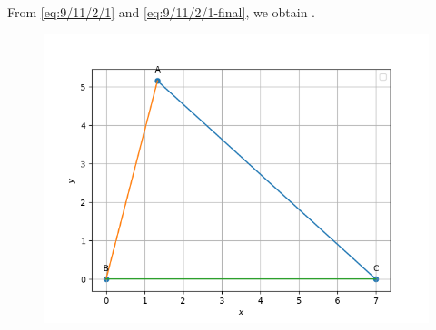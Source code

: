 		From 
		\eqref{eq:9/11/2/1}
		and 
		\eqref{eq:9/11/2/1-final},
		we obtain
		.
	\begin{figure}[!h]
		\centering
 \includegraphics[width=\columnwidth]{chapters/9/11/2/1/figs/Figure_1.png}
		\caption{}
		\label{fig:9/11/2/1}
  	\end{figure}
	

